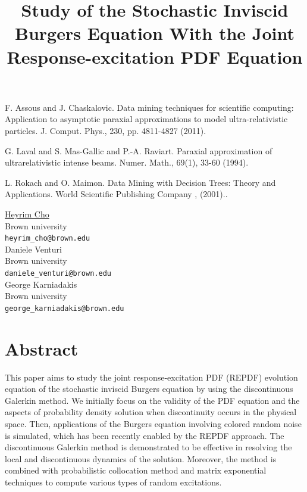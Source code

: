 \documentclass[article, A4, 11pt]{llncs}%
\begin{document}

\begin{thebibliography}{10}
{\sc F. Assous and J. Chaskalovic}. {Data mining techniques for scientific computing: Application to asymptotic paraxial approximations to model ultra-relativistic particles}. J. Comput. Phys., 230, pp. 4811-4827 (2011).

{\sc G. Laval and S. Mas-Gallic and P.-A. Raviart}. {Paraxial approximation of ultrarelativistic intense beams}. Numer. Math., 69(1), 33-60 (1994).

{\sc L. Rokach and O. Maimon}. {Data Mining with Decision Trees: Theory and Applications}. World Scientific Publishing Company , (2001)..
\end{thebibliography} %

\title{Study of the Stochastic Inviscid Burgers Equation With the Joint Response-excitation PDF Equation}
 \author{} \institute{}
\maketitle
\begin{center}
{\large \underline{Heyrim Cho}}\\
Brown university\\
{\tt heyrim\_cho@brown.edu}
\\ \vspace{4mm}
{\large Daniele Venturi}\\
Brown university\\
{\tt daniele\_venturi@brown.edu}
\\ \vspace{4mm}
{\large George Karniadakis}\\
Brown university\\
{\tt george\_karniadakis@brown.edu}
\end{center}

\section*{Abstract}
This paper aims to study the joint response-excitation PDF (REPDF) evolution equation of the stochastic inviscid Burgers equation by using the discontinuous Galerkin method. We initially focus on the validity of the PDF equation and the aspects of probability density solution when discontinuity occurs in the physical space. Then, applications of the Burgers equation involving colored random noise is simulated, which has been recently enabled by the REPDF approach. The discontinuous Galerkin method is demonstrated to be effective in resolving the local and discontinuous dynamics of the solution. Moreover, the method is combined with probabilistic collocation method and matrix exponential techniques to compute various types of random excitations. 
\end{document}
